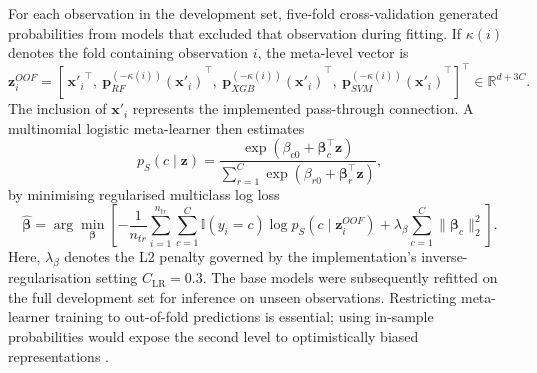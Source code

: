 \documentclass{elektr}
\begin{document}
For each observation in the development set, five-fold cross-validation generated probabilities from models that excluded that observation during fitting. If $\kappa(i)$ denotes the fold containing observation $i$, the meta-level vector is
\begin{equation}
\mathbf{z}^{OOF}_i=\left[\,{\mathbf{x}'_i}^{\!\top},\
{\mathbf{p}_{RF}^{(-\kappa(i))}(\mathbf{x}'_i)}^{\!\top},\
{\mathbf{p}_{XGB}^{(-\kappa(i))}(\mathbf{x}'_i)}^{\!\top},\
{\mathbf{p}_{SVM}^{(-\kappa(i))}(\mathbf{x}'_i)}^{\!\top}\right]^{\!\top}
\in\mathbb{R}^{d+3C}.
\label{eq:oofvector}
\end{equation}
The inclusion of $\mathbf{x}'_i$ represents the implemented pass-through connection. A multinomial logistic meta-learner then estimates
\begin{equation}
p_{S}(c\mid\mathbf{z})=
\frac{\exp(\beta_{c0}+\boldsymbol{\beta}_c^{\top}\mathbf{z})}
{\sum_{r=1}^{C}\exp(\beta_{r0}+\boldsymbol{\beta}_r^{\top}\mathbf{z})},
\label{eq:meta}
\end{equation}
by minimising regularised multiclass log loss
\begin{equation}
\widehat{\boldsymbol{\beta}}=
\arg\min_{\boldsymbol{\beta}}
\left[-\frac{1}{n_{tr}}\sum_{i=1}^{n_{tr}}\sum_{c=1}^{C}
\mathbb{I}(y_i=c)\log p_S(c\mid\mathbf{z}^{OOF}_i)
+\lambda_{\beta}\sum_{c=1}^{C}\lVert\boldsymbol{\beta}_c\rVert_2^2\right].
\label{eq:metaloss}
\end{equation}
Here, $\lambda_{\beta}$ denotes the L2 penalty governed by the implementation's inverse-regularisation setting $C_{\mathrm{LR}}=0.3$. The base models were subsequently refitted on the full development set for inference on unseen observations. Restricting meta-learner training to out-of-fold predictions is essential; using in-sample probabilities would expose the second level to optimistically biased representations \cite{kapoor2023,alabi2023}.
\end{document}
